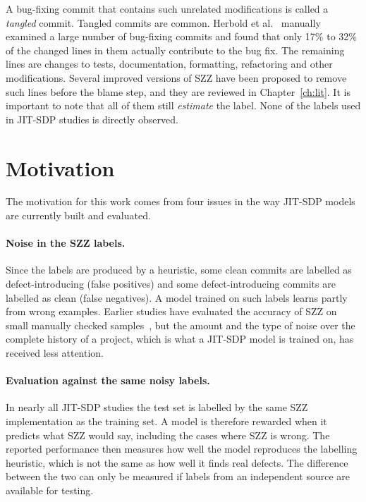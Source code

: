\documentclass[12pt,a4paper,oneside]{report}
\begin{document}
A bug-fixing commit that contains such unrelated modifications is called a
\emph{tangled} commit. Tangled commits are common. Herbold et
al.~\cite{herbold2022tangling} manually examined a large number of bug-fixing
commits and found that only 17\% to 32\% of the changed lines in them actually
contribute to the bug fix. The remaining lines are changes to tests,
documentation, formatting, refactoring and other modifications. Several
improved versions of SZZ have been proposed to remove such lines before the
blame step, and they are reviewed in Chapter~\ref{ch:lit}. It is important to
note that all of them still \emph{estimate} the label. None of the labels used
in JIT-SDP studies is directly observed.

\section{Motivation}

The motivation for this work comes from four issues in the way JIT-SDP models
are currently built and evaluated.

\paragraph{Noise in the SZZ labels.} Since the labels are produced by a
heuristic, some clean commits are labelled as defect-introducing (false
positives) and some defect-introducing commits are labelled as clean (false
negatives). A model trained on such labels learns partly from wrong examples.
Earlier studies have evaluated the accuracy of SZZ on small manually checked
samples~\cite{dacosta2017maszz,rosa2021oracle}, but the amount and the
type of noise over the complete history of a project, which is what a JIT-SDP
model is trained on, has received less attention.

\paragraph{Evaluation against the same noisy labels.} In nearly all JIT-SDP
studies the test set is labelled by the same SZZ implementation as the
training set. A model is therefore rewarded when it predicts what SZZ would
say, including the cases where SZZ is wrong. The reported performance then
measures how well the model reproduces the labelling heuristic, which is not
the same as how well it finds real defects. The difference between the two can
only be measured if labels from an independent source are available for
testing.
\end{document}
